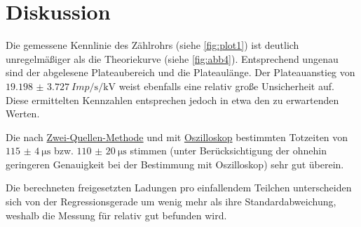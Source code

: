 \section{Diskussion} \label{sec:Diskussion}

Die gemessene Kennlinie des Zählrohrs (siehe \autoref{fig:plot1}) ist deutlich unregelmäßiger als die Theoriekurve (siehe \autoref{fig:abb4}).
Entsprechend ungenau sind der abgelesene Plateaubereich und die Plateaulänge.
Der Plateauanstieg von $\SI{19.198(3727)}{{Imp}\per\second\per\kilo\volt}$ weist ebenfalls eine relativ große Unsicherheit auf.
Diese ermittelten Kennzahlen entsprechen jedoch in etwa den zu erwartenden Werten.


Die nach \hyperref[sec:totzeit_zweiquellen]{Zwei-Quellen-Methode} und mit \hyperref[sec:totzeit_zweiquellen]{Oszilloskop} bestimmten Totzeiten
von $\SI{115(4)}{\micro\second}$ bzw. $\SI{110(20)}{\micro\second}$
stimmen (unter Berücksichtigung der ohnehin geringeren Genauigkeit bei der Bestimmung mit Oszilloskop)
sehr gut überein.


Die berechneten freigesetzten Ladungen pro einfallendem Teilchen
unterscheiden sich von der Regressionsgerade um wenig mehr als ihre Standardabweichung,
weshalb die Messung für relativ gut befunden wird.
